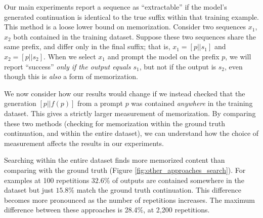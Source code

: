 Our main experiments report a sequence as ``extractable'' if the model's generated continuation is identical to the true suffix within that training example.
This method is a loose lower bound on memorization.
Consider two sequences $x_1$, $x_2$ both contained in the training dataset.
Suppose these two sequences share the same prefix, and differ only in the final suffix;
that is, $x_1 = [p || s_1]$ and $x_2 = [p || s_2]$.
When we select $x_1$ and prompt the model on the prefix $p$, we will 
report ``success'' \emph{only if the output equals $s_1$}, but not if the output is $s_2$,
even though this is \emph{also} a form of memorization.
%

We now consider how our results would change if we instead checked that the generation $[p || f(p)]$ from a prompt $p$ was contained \emph{anywhere} in the training dataset. This gives a strictly larger measurement of memorization.
By comparing these two methods (checking for memorization within the ground truth continuation, and within the entire dataset), we can understand how the choice of measurement affects the results in our experiments. 



Searching within the entire dataset finds more memorized content than comparing with the ground truth (Figure \ref{fig:other_approaches_search}). 
For examples at 100 repetitions $32.6\%$ of outputs are contained somewhere in the dataset but just $15.8\%$ match the ground truth continuation.
This difference becomes more pronounced as the number of repetitions increases. 
The maximum difference between these approaches is 28.4\%, at 2{,}200 repetitions.

